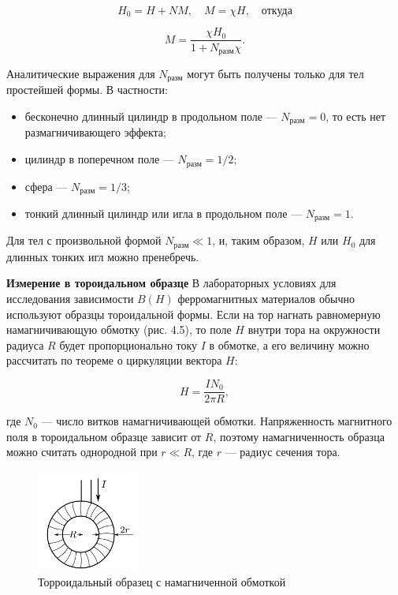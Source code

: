 \documentclass[12pt,a4paper]{article}
\begin{document}
\[
H_0 = H + NM, \quad M = \chi H, \quad \text{откуда}
\]

\[
M = \frac{\chi H_0}{1 + N_{\text{разм}} \chi}.
\]


Аналитические выражения для \(N_{\text{разм}}\) могут быть получены только для тел простейшей формы. В частности:

\begin{itemize}
    \item бесконечно длинный цилиндр в продольном поле — \(N_{\text{разм}} = 0\), то есть нет размагничивающего эффекта;
    \item цилиндр в поперечном поле — \(N_{\text{разм}} = 1/2\);
    \item сфера — \(N_{\text{разм}} = 1/3\);
    \item тонкий длинный цилиндр или игла в продольном поле — \(N_{\text{разм}} = 1\).
\end{itemize}

Для тел с произвольной формой \(N_{\text{разм}} \ll 1\), и, таким образом, \(H\) или \(H_0\) для длинных тонких игл можно пренебречь.

\textbf{Измерение в тороидальном образце}
В лабораторных условиях для исследования зависимости $B(H)$ ферромагнитных материалов обычно используют образцы тороидальной формы. Если на тор нагнать равномерную намагничивающую обмотку (рис. 4.5), то поле $H$ внутри тора на окружности радиуса $R$ будет пропорционально току $I$ в обмотке, а его величину можно рассчитать по теореме о циркуляции вектора $H$:

\begin{equation}
H = \frac{I N_0}{2 \pi R}, \tag{4.16}
\end{equation}

где $N_0$ — число витков намагничивающей обмотки. Напряженность магнитного поля в тороидальном образце зависит от $R$, поэтому намагниченность образца можно считать однородной при $r \ll R$, где $r$ — радиус сечения тора.

\begin{figure}[h]
    \centering
    \includegraphics[width=0.3\textwidth]{image.png} 
    \caption{Торроидальный образец с намагниченной обмоткой}
    \label{fig:toroidal_sample}
\end{figure}
\end{document}
